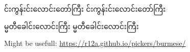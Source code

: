 \documentclass[landscape]{memoir}
\newcommand{\burmeseTest}[1]{
{\burmeseFamily{} #1}
\hfill
{\burmeseFamilyDecom{} #1}
}
\begin{document}
\burmeseTest{င်းကွန်းင်းလောင်းတော်ကြီး}

\bigskip
\burmeseTest{မ္မတီခေါင်းလောင်းကြီး}


\bigskip
Might be usefull: \url{https://r12a.github.io/pickers/burmese/}
\end{document}
